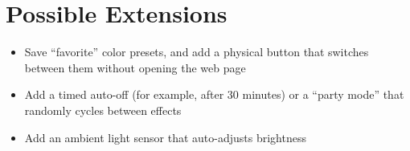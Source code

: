 \section{Possible Extensions}
\begin{itemize}
    \item Save ``favorite'' color presets, and add a physical button that switches between them
          without opening the web page
    \item Add a timed auto-off (for example, after 30 minutes) or a ``party mode'' that randomly
          cycles between effects
    \item Add an ambient light sensor that auto-adjusts brightness
\end{itemize}
